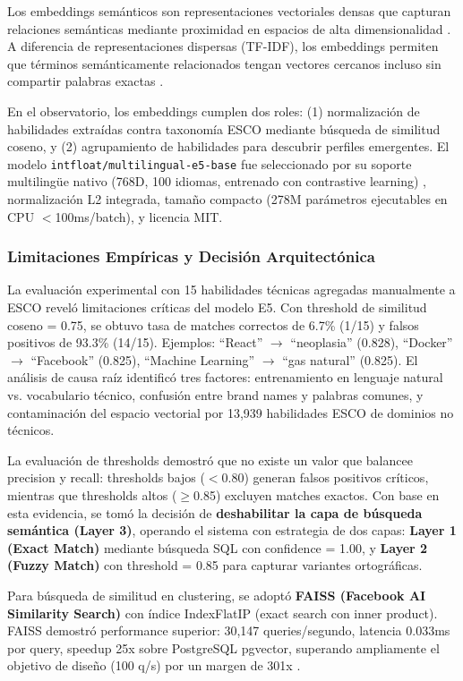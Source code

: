 Los embeddings semánticos son representaciones vectoriales densas que capturan relaciones semánticas mediante proximidad en espacios de alta dimensionalidad \cite{mikolov2013}. A diferencia de representaciones dispersas (TF-IDF), los embeddings permiten que términos semánticamente relacionados tengan vectores cercanos incluso sin compartir palabras exactas \cite{reimers2019}.

En el observatorio, los embeddings cumplen dos roles: (1) normalización de habilidades extraídas contra taxonomía ESCO mediante búsqueda de similitud coseno, y (2) agrupamiento de habilidades para descubrir perfiles emergentes. El modelo \texttt{intfloat/multilingual-e5-base} fue seleccionado por su soporte multilingüe nativo (768D, 100 idiomas, entrenado con contrastive learning) \cite{wang2024}, normalización L2 integrada, tamaño compacto (278M parámetros ejecutables en CPU $<$100ms/batch), y licencia MIT.

\subsubsection{Limitaciones Empíricas y Decisión Arquitectónica}

La evaluación experimental con 15 habilidades técnicas agregadas manualmente a ESCO reveló limitaciones críticas del modelo E5. Con threshold de similitud coseno = 0.75, se obtuvo tasa de matches correctos de 6.7\% (1/15) y falsos positivos de 93.3\% (14/15). Ejemplos: ``React'' $\rightarrow$ ``neoplasia'' (0.828), ``Docker'' $\rightarrow$ ``Facebook'' (0.825), ``Machine Learning'' $\rightarrow$ ``gas natural'' (0.825). El análisis de causa raíz identificó tres factores: entrenamiento en lenguaje natural vs. vocabulario técnico, confusión entre brand names y palabras comunes, y contaminación del espacio vectorial por 13,939 habilidades ESCO de dominios no técnicos.

La evaluación de thresholds demostró que no existe un valor que balancee precision y recall: thresholds bajos ($<$0.80) generan falsos positivos críticos, mientras que thresholds altos ($\geq$0.85) excluyen matches exactos. Con base en esta evidencia, se tomó la decisión de \textbf{deshabilitar la capa de búsqueda semántica (Layer 3)}, operando el sistema con estrategia de dos capas: \textbf{Layer 1 (Exact Match)} mediante búsqueda SQL con confidence = 1.00, y \textbf{Layer 2 (Fuzzy Match)} con threshold = 0.85 para capturar variantes ortográficas.

Para búsqueda de similitud en clustering, se adoptó \textbf{FAISS (Facebook AI Similarity Search)} con índice IndexFlatIP (exact search con inner product). FAISS demostró performance superior: 30,147 queries/segundo, latencia 0.033ms por query, speedup 25x sobre PostgreSQL pgvector, superando ampliamente el objetivo de diseño (100 q/s) por un margen de 301x \cite{johnson2019}.

